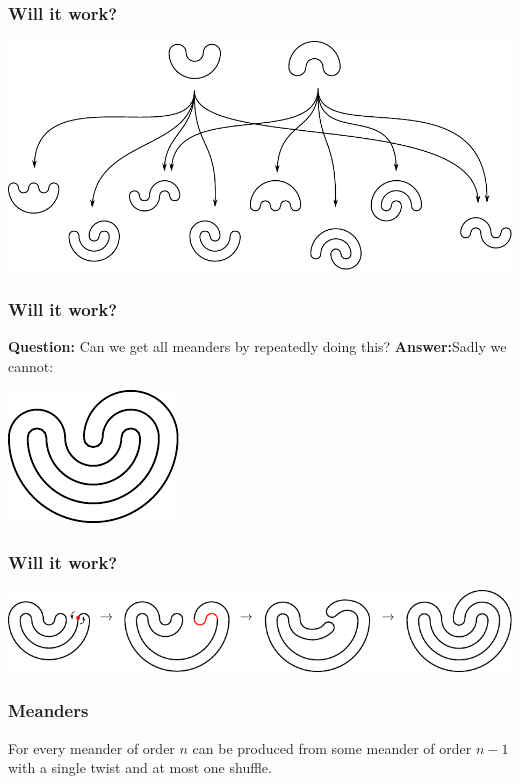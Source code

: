 \documentclass{beamer}
\begin{document}
\begin{frame}
\frametitle{Will it work?}
\begin{center}
\includegraphics[width=\textwidth]{meanders/2-into-3_4.pdf}
\end{center}
\end{frame}

\begin{frame}
\frametitle{Will it work?}
\textbf{Question:} Can we get all meanders by repeatedly doing this?
\pause
\pause\textbf{Answer:}\pause Sadly we cannot:

\begin{center}
\includegraphics[width=.4\textwidth]{meanders/5-example.pdf}
\end{center}

\end{frame}

\begin{frame}
\frametitle{Will it work?}
\begin{center}
\includegraphics[width=\textwidth]{meanders/5-shuffle.pdf}
\end{center}

\end{frame}

\begin{frame}
\frametitle{Meanders}
\begin{theorem}
For every meander of order $n$ can be produced from some meander of order $n-1$ with a single twist and at most one shuffle.
\end{theorem}
\end{frame}
\end{document}
